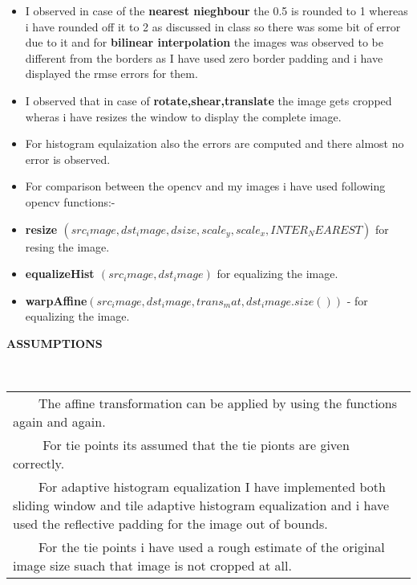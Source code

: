 \documentclass[11pt,a4paper,sans]{moderncv}        %
\newcommand{\lsep}{-0.5cm}
\newcommand{\resheading}[1]{{\small \colorbox{mygrey}{\begin{minipage}{0.975\textwidth}{\textbf{#1 \vphantom{p\^{E}}}}\end{minipage}}}}
\begin{document}
\begin{itemize}
\item \noindent I observed in case of the \textbf{nearest nieghbour} the 0.5 is rounded to 1 whereas i have rounded off it to 2 as discussed in class so there was some bit of error due to it and for \textbf{bilinear interpolation} the images was observed to be different from the borders as I have used zero border padding and i have displayed the  rmse errors for them. 
\item \noindent I observed that in case of \textbf{rotate,shear,translate} the image gets cropped wheras i have resizes the window to display the complete image.
\item \noindent For histogram equlaization also the errors are computed and there almost no error is observed.
\item \noindent For comparison between the opencv and my images i have used following opencv functions:-
\item \textbf{ resize $( src_image,dst_image,dsize,scale_y,scale_x,INTER_NEAREST )$ } for resing the image.
\item \textbf{equalizeHist $( src_image, dst_image)$ }  for equalizing the image.
\item \textbf{ warpAffine$(src_image, dst_image, trans_mat, dst_image.size() )$ } - for equalizing the image.

\end{itemize}

\vspace{8pt}

\newcommand{\tabitem}{~~\llap{\textbullet}~~}

\resheading{\textbf{{\selectfont ASSUMPTIONS } }}\\[\lsep]
\vspace{8pt}

\indent \begin{tabu}{ *1{X[-1,l,m] }}
\tabitem  The affine transformation can be applied by using the functions again and again. \\ 
\tabitem 
For tie points its assumed that the tie pionts are given correctly. \\
\tabitem For adaptive histogram equalization I have implemented both sliding window and tile adaptive histogram equalization and i have used the reflective padding for the image out of bounds.  \\
\tabitem For the tie points i have used a rough estimate of the original image size suach that image is not cropped at all. \\
\end{tabu}
\end{document}
